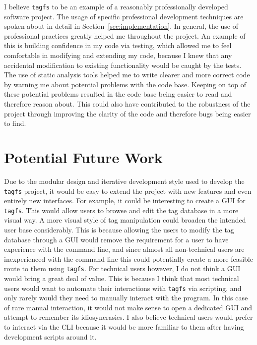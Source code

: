 I believe \texttt{tagfs} to be an example of a reasonably professionally
developed software project. The usage of specific professional development
techniques are spoken about in detail in Section~\ref{sec:implementation}. In
general, the use of professional practices greatly helped me throughout the
project. An example of this is building confidence in my code via testing,
which allowed me to feel comfortable in modifying and extending my code,
because I knew that any accidental modification to existing functionality would
be caught by the tests. The use of static analysis tools helped me to write
clearer and more correct code by warning me about potential problems with the
code base. Keeping on top of these potential problems resulted in the code base
being easier to read and therefore reason about. This could also have
contributed to the robustness of the project through improving the clarity of
the code and therefore bugs being easier to find.

\section{Potential Future Work}


Due to the modular design and iterative development style used to develop the
\texttt{tagfs} project, it would be easy to extend the project with new
features and even entirely new interfaces. For example, it could be interesting
to create a GUI for \texttt{tagfs}. This would allow users to browse and edit
the tag database in a more visual way. A more visual style of tag manipulation
could broaden the intended user base considerably. This is because allowing the
users to modify the tag database through a GUI would remove the requirement for
a user to have experience with the command line, and since almost all
non-technical users are inexperienced with the command line this could
potentially create a more feasible route to them using \texttt{tagfs}. For
technical users however, I do not think a GUI would bring a great deal of
value. This is because I think that most technical users would want to automate
their interactions with \texttt{tagfs} via scripting, and only rarely would
they need to manually interact with the program. In this case of rare manual
interaction, it would not make sense to open a dedicated GUI and attempt to
remember its idiosyncrasies. I also believe technical users would prefer to
interact via the CLI because it would be more familiar to them after having
development scripts around it.

